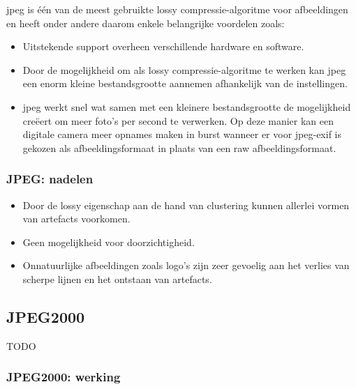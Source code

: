 \Gls{jpeg} is één van de meest gebruikte \gls{lossy} \gls{compressie-algoritme} voor afbeeldingen en heeft onder andere daarom enkele belangrijke voordelen zoals:

\begin{itemize}
	\item Uitstekende support overheen verschillende hardware en software.
	
	\item Door de mogelijkheid om als \gls{lossy} \gls{compressie-algoritme} te werken kan \gls{jpeg} een enorm kleine bestandsgrootte aannemen afhankelijk van de instellingen.
	
	\item \Gls{jpeg} werkt snel wat samen met een kleinere bestandsgrootte de mogelijkheid creëert om meer foto's per second te verwerken. Op deze manier kan een digitale camera meer opnames maken in burst wanneer er voor \gls{jpeg-exif} is gekozen als \gls{afbeeldingsformaat} in plaats van een \gls{raw} \gls{afbeeldingsformaat}. 
\end{itemize}

\subsubsection{JPEG: nadelen}
\label{sec:afbeeldingscompressie-jpeg-nadelen}

\begin{itemize}
	\item Door de \gls{lossy} eigenschap aan de hand van clustering kunnen allerlei vormen van \glspl{artefact} voorkomen.
	
	\item Geen mogelijkheid voor doorzichtigheid.
	
	\item Onnatuurlijke afbeeldingen zoals logo's zijn zeer gevoelig aan het verlies van scherpe lijnen en het ontstaan van \glspl{artefact}.
\end{itemize}

\subsection{JPEG2000}
\label{sec:afbeeldingscompressie-jpeg2000}

TODO

\subsubsection{JPEG2000: werking}
\label{sec:afbeeldingscompressie-jpeg2000-werking}


